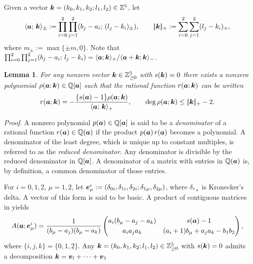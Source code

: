 \documentclass[a4paper,12pt]{article}
\theoremstyle{plain}
\newtheorem{lemma}[theorem]{Lemma}
\def\Q{\mathbb{Q}}
\def\Z{\mathbb{Z}}
\def\ba{\mbox{\boldmath $a$}}
\def\be{\mbox{\boldmath $e$}}
\def\bk{\mbox{\boldmath $k$}}
\def\bv{\mbox{\boldmath $v$}}
\begin{document}
Given a vector $\bk = (k_0,k_1,k_2; l_1, l_2) \in \Z^5$, let    
\[
\langle \ba; \, \bk \rangle_{\pm} 
:= \prod_{i=0}^2 \prod_{j=1}^2 (b_j-a_i; \, (l_j-k_i)_{\pm}), 
\qquad   
|\!| \bk |\!|_+ := \sum_{i=0}^2 \sum_{j=1}^2 (l_j-k_i)_+,   
\]
where $m_{\pm} := \max\{ \pm m, 0\}$.  
Note that $\prod_{i=0}^2 \prod_{j=1}^2 (b_j-a_i; \, l_j-k_i) = 
\langle \ba; \bk \rangle_+/\langle \ba + \bk; \bk \rangle_-$.   
\begin{lemma} \label{lem:factorial}
For any nonzero vector $\bk \in \Z_{\ge 0}^5$ with $s(\bk) = 0$ there 
exists a nonzero polynomial $\rho(\ba; \bk) \in \Q[\ba]$ such that the rational 
function $r(\ba; \bk)$ can be written  
\begin{equation} \label{eqn:rho}
r(\ba; \bk) = - \frac{ \{ s(\ba) -1 \} \rho(\ba; \bk) }{\langle \ba; \, \bk \rangle_+}, 
\qquad  \deg \rho(\ba; \bk)  \le |\!| \bk |\!|_+ - 2.   
\end{equation}
\end{lemma}
{\it Proof}.      
A nonzero polynomial $p(\ba) \in \Q[\ba]$ is said to be a {\sl denominator} 
of a rational function $r(\ba) \in \Q(\ba)$ if the product $p(\ba) \, r(\ba)$ 
becomes a polynomial.  
A denominator of the least degree, which is unique up to constant multiples, 
is referred to as the {\sl reduced denominator}. 
Any denominator is divisible by the reduced denominator in $\Q[\ba]$. 
A denominator of a matrix with entries in $\Q(\ba)$ is, by definition, 
a common denominator of those entries.   
\par
For $i = 0, 1, 2$,  $\mu = 1, 2$, let $\be_{\mu}^i := 
(\delta_{0i}, \delta_{1i}, \delta_{2i}; \delta_{1\mu}, \delta_{2\mu})$,   
where $\delta_{*\star}$ is Kronecker's delta.   
A vector of this form is said to be basic. 
A product of contiguous matrices in \cite[Table 2]{EI} yields   
\[
A(\ba; \be_{\mu}^i) = \frac{1}{ (b_{\mu}-a_j)(b_{\mu}-a_k) }
\begin{pmatrix}
a_i(b_{\mu}-a_j-a_k) & s(\ba)-1 \\[1mm]
a_i a_j a_k & (a_i+1) b_{\mu} + a_j a_k - b_1 b_2 
\end{pmatrix},  
\]
where $\{i, j, k\} = \{0, 1, 2\}$. 
Any $\bk = (k_0, k_1, k_2; l_1, l_2) \in \Z_{\ge0}^5$ with $s(\bk) = 0$ 
admits a decomposition $\bk = \bv_l + \cdots + \bv_1$  
\end{document}
